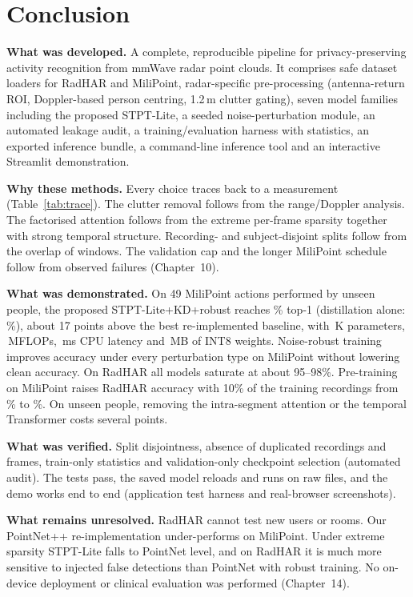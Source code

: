 \chapter{Conclusion}

\textbf{What was developed.} A complete, reproducible pipeline for
privacy-preserving activity recognition from mmWave radar point clouds. It
comprises safe dataset loaders for RadHAR and MiliPoint, radar-specific
pre-processing (antenna-return ROI, Doppler-based person centring, 1.2\,m clutter
gating), seven model families including the proposed STPT-Lite, a seeded
noise-perturbation module, an automated leakage audit, a training/evaluation
harness with statistics, an exported inference bundle, a command-line inference
tool and an interactive Streamlit demonstration.

\textbf{Why these methods.} Every choice traces back to a measurement
(Table~\ref{tab:trace}). The clutter removal follows from the range/Doppler
analysis. The factorised attention follows from the extreme per-frame sparsity
together with strong temporal structure. Recording- and subject-disjoint splits
follow from the overlap of windows. The validation cap and the longer MiliPoint
schedule follow from observed failures (Chapter~10).

\textbf{What was demonstrated.} On 49 MiliPoint actions performed by unseen
people, the proposed STPT-Lite+KD+robust reaches \mistptlitekdrobustAcc\% top-1
(distillation alone: \mistptlitekdAcc\%), about 17 points above the best re-implemented
baseline, with \oursParamsK\,K parameters, \oursMflops\,MFLOPs, \oursLat\,ms CPU
latency and \oursIntMB\,MB of INT8 weights. Noise-robust training improves
accuracy under every perturbation type on MiliPoint without lowering clean
accuracy. On RadHAR all models saturate at about 95--98\%. Pre-training on
MiliPoint raises RadHAR accuracy with 10\% of the training recordings from
\trrhxyzscratchfTen\% to \trrhxyzmpinitfTen\%. On unseen people, removing the
intra-segment attention or the temporal Transformer costs several points.

\textbf{What was verified.} Split disjointness, absence of duplicated
recordings and frames, train-only statistics and validation-only checkpoint
selection (automated audit). The tests pass, the saved model reloads and runs on
raw files, and the demo works end to end (application test harness and
real-browser screenshots).

\textbf{What remains unresolved.} RadHAR cannot test new users or rooms. Our
PointNet++ re-implementation under-performs on MiliPoint. Under extreme
sparsity STPT-Lite falls to PointNet level, and on RadHAR it is much more
sensitive to injected false detections than PointNet with robust training. No on-device deployment or
clinical evaluation was performed (Chapter~14).
